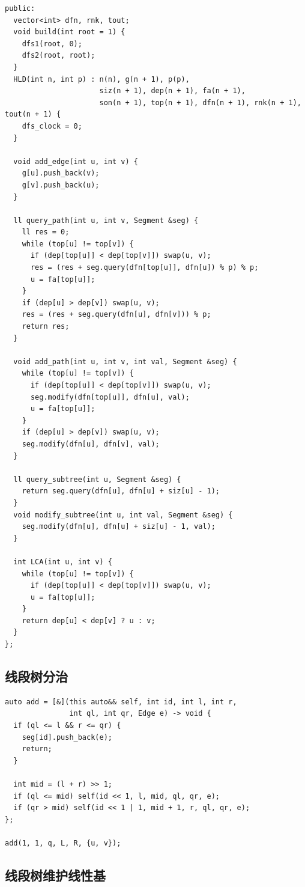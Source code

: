 \documentclass[10pt]{article}
\begin{document}
\begin{multicols*}{2}
\begin{verbatim}
public:
  vector<int> dfn, rnk, tout;
  void build(int root = 1) {
    dfs1(root, 0);
    dfs2(root, root);
  }
  HLD(int n, int p) : n(n), g(n + 1), p(p),
                      siz(n + 1), dep(n + 1), fa(n + 1),
                      son(n + 1), top(n + 1), dfn(n + 1), rnk(n + 1), tout(n + 1) {
    dfs_clock = 0;
  }

  void add_edge(int u, int v) {
    g[u].push_back(v);
    g[v].push_back(u);
  }

  ll query_path(int u, int v, Segment &seg) {
    ll res = 0;
    while (top[u] != top[v]) {
      if (dep[top[u]] < dep[top[v]]) swap(u, v);
      res = (res + seg.query(dfn[top[u]], dfn[u]) % p) % p;
      u = fa[top[u]];
    }
    if (dep[u] > dep[v]) swap(u, v);
    res = (res + seg.query(dfn[u], dfn[v])) % p;
    return res;
  }

  void add_path(int u, int v, int val, Segment &seg) {
    while (top[u] != top[v]) {
      if (dep[top[u]] < dep[top[v]]) swap(u, v);
      seg.modify(dfn[top[u]], dfn[u], val);
      u = fa[top[u]];
    }
    if (dep[u] > dep[v]) swap(u, v);
    seg.modify(dfn[u], dfn[v], val);
  }

  ll query_subtree(int u, Segment &seg) {
    return seg.query(dfn[u], dfn[u] + siz[u] - 1);
  }
  void modify_subtree(int u, int val, Segment &seg) {
    seg.modify(dfn[u], dfn[u] + siz[u] - 1, val);
  }

  int LCA(int u, int v) {
    while (top[u] != top[v]) {
      if (dep[top[u]] < dep[top[v]]) swap(u, v);
      u = fa[top[u]];
    }
    return dep[u] < dep[v] ? u : v;
  }
};
\end{verbatim}




\subsection{线段树分治}


\begin{verbatim}
auto add = [&](this auto&& self, int id, int l, int r,
               int ql, int qr, Edge e) -> void {
  if (ql <= l && r <= qr) {
    seg[id].push_back(e);
    return;
  }

  int mid = (l + r) >> 1;
  if (ql <= mid) self(id << 1, l, mid, ql, qr, e);
  if (qr > mid) self(id << 1 | 1, mid + 1, r, ql, qr, e);
};

add(1, 1, q, L, R, {u, v});
\end{verbatim}


\subsection{线段树维护线性基}



\end{multicols*}
\end{document}
